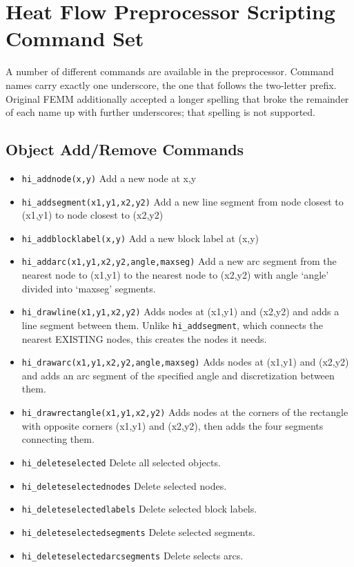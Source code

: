\section{Heat Flow Preprocessor Scripting Command Set}

A number of different commands are available in the preprocessor.
Command names carry exactly one underscore, the one that follows the
two-letter prefix.  Original FEMM additionally accepted a longer
spelling that broke the remainder of each name up with further
underscores; that spelling is not supported.

\subsection{Object Add/Remove Commands}
\begin{itemize}
\item {\tt hi\_addnode(x,y)} Add a new node at x,y

\item {\tt hi\_addsegment(x1,y1,x2,y2)} Add a new line segment from node closest to
(x1,y1) to node closest to (x2,y2)

\item {\tt hi\_addblocklabel(x,y)} Add a new block label at (x,y)

\item {\tt hi\_addarc(x1,y1,x2,y2,angle,maxseg)} Add a new arc segment from the
nearest node to (x1,y1) to the nearest node to (x2,y2) with angle `angle'
divided into `maxseg' segments.

\item{\tt hi\_drawline(x1,y1,x2,y2)} Adds nodes at (x1,y1) and (x2,y2) and adds a line segment between them. Unlike {\tt hi\_addsegment}, which connects the nearest EXISTING nodes, this creates the nodes it needs.

\item{\tt hi\_drawarc(x1,y1,x2,y2,angle,maxseg)} Adds nodes at (x1,y1) and (x2,y2) and adds an arc segment of the specified angle and discretization between them.

\item{\tt hi\_drawrectangle(x1,y1,x2,y2)} Adds nodes at the corners of the rectangle with opposite corners (x1,y1) and (x2,y2), then adds the four segments connecting them.

\item {\tt hi\_deleteselected} Delete all selected objects.

\item {\tt hi\_deleteselectednodes} Delete selected nodes.

\item {\tt hi\_deleteselectedlabels} Delete selected block labels.

\item {\tt hi\_deleteselectedsegments} Delete selected segments.

\item {\tt hi\_deleteselectedarcsegments} Delete selects arcs.
\end{itemize}


